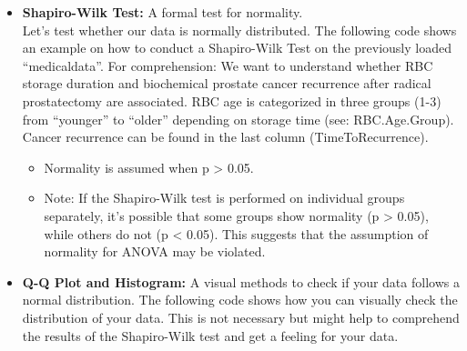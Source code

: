 \documentclass[
]{article}
\newenvironment{Shaded}{\begin{snugshade}}{\end{snugshade}}
\newcommand{\CommentTok}[1]{\textcolor[rgb]{0.56,0.35,0.01}{\textit{#1}}}
\newcommand{\FunctionTok}[1]{\textcolor[rgb]{0.13,0.29,0.53}{\textbf{#1}}}
\newcommand{\NormalTok}[1]{#1}
\newcommand{\OtherTok}[1]{\textcolor[rgb]{0.56,0.35,0.01}{#1}}
\newcommand{\SpecialCharTok}[1]{\textcolor[rgb]{0.81,0.36,0.00}{\textbf{#1}}}
\providecommand{\tightlist}{%
  \setlength{\itemsep}{0pt}\setlength{\parskip}{0pt}}
\begin{document}
\begin{itemize}
\item
  \textbf{Shapiro-Wilk Test:} A formal test for normality.\\
  Let's test whether our data is normally distributed. The following
  code shows an example on how to conduct a Shapiro-Wilk Test on the
  previously loaded ``medicaldata''. For comprehension: We want to
  understand whether RBC storage duration and biochemical prostate
  cancer recurrence after radical prostatectomy are associated. RBC age
  is categorized in three groups (1-3) from ``younger'' to ``older''
  depending on storage time (see: RBC.Age.Group). Cancer recurrence can
  be found in the last column (TimeToRecurrence).

  \begin{itemize}
  \tightlist
  \item
    Normality is assumed when p \textgreater{} 0.05.
  \item
    Note: If the Shapiro-Wilk test is performed on individual groups
    separately, it's possible that some groups show normality (p
    \textgreater{} 0.05), while others do not (p \textless{} 0.05). This
    suggests that the assumption of normality for ANOVA may be violated.
  \end{itemize}
\end{itemize}

\begin{Shaded}
\end{Shaded}

\begin{itemize}
\tightlist
\item
  \textbf{Q-Q Plot and Histogram:} A visual methods to check if your
  data follows a normal distribution. The following code shows how you
  can visually check the distribution of your data. This is not
  necessary but might help to comprehend the results of the Shapiro-Wilk
  test and get a feeling for your data.
\end{itemize}
\end{document}
